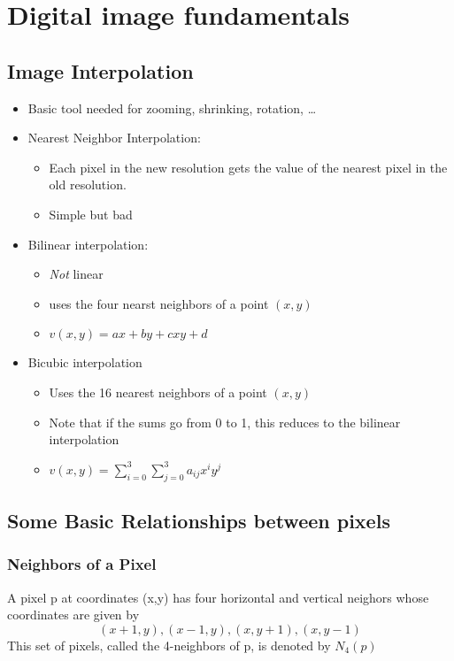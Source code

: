 \section{Digital image fundamentals }
\subsection{Image Interpolation }
\begin{itemize}
  \item Basic tool needed for zooming, shrinking, rotation, \ldots
  \item Nearest Neighbor Interpolation: 
	  \begin{itemize}
		  \item Each pixel in the new resolution gets the value of the nearest pixel in the old resolution.
		  \item Simple but bad
	\end{itemize}
  \item Bilinear interpolation:
  	\begin{itemize}
		\item \emph{Not} linear
  	  \item uses the four nearst neighbors of a point $(x,y)$
  	  \item $v(x,y) = ax + by + cxy + d$
  	\end{itemize}
  \item Bicubic interpolation
	\begin{itemize}
  	  \item Uses the 16 nearest neighbors of a point $(x,y)$
  	  \item Note that if the sums go from 0 to 1, this reduces to the bilinear interpolation
  	  \item $v(x,y) = \sum\limits_{i=0}^3\sum\limits_{j=0}^3 a_{ij}x^iy^j$
  	\end{itemize}
\end{itemize}


\subsection{Some Basic Relationships between pixels }
\subsubsection{Neighbors of a Pixel}
A pixel p at coordinates (x,y) has four horizontal and vertical neighors whose coordinates are given by
\[
	(x+1, y), (x-1, y), (x, y+1), (x, y-1)
\]
This set of pixels, called the 4-neighbors of p, is denoted by $N_4(p)$


